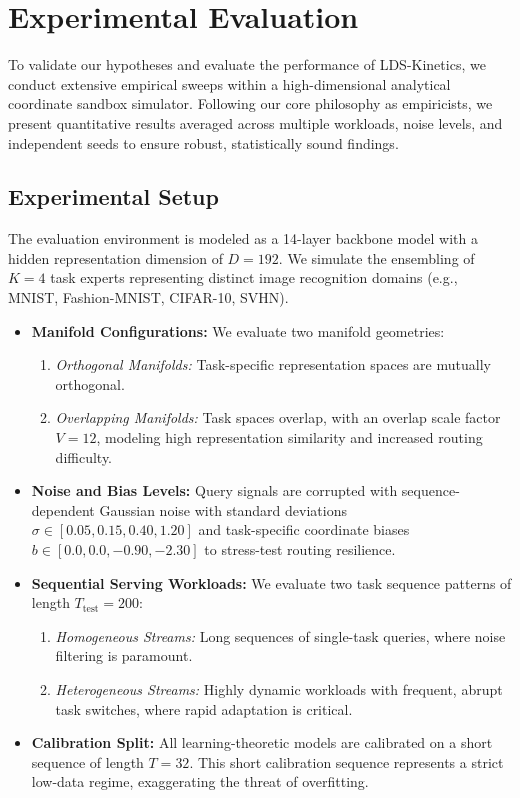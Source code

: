 \section{Experimental Evaluation}
\label{submission:sec:experiments}

To validate our hypotheses and evaluate the performance of LDS-Kinetics, we conduct extensive empirical sweeps within a high-dimensional analytical coordinate sandbox simulator. Following our core philosophy as empiricists, we present quantitative results averaged across multiple workloads, noise levels, and independent seeds to ensure robust, statistically sound findings.

\subsection{Experimental Setup}
The evaluation environment is modeled as a 14-layer backbone model with a hidden representation dimension of $D = 192$. We simulate the ensembling of $K = 4$ task experts representing distinct image recognition domains (e.g., MNIST, Fashion-MNIST, CIFAR-10, SVHN).

\begin{itemize}
    \item \textbf{Manifold Configurations:} We evaluate two manifold geometries:
    \begin{enumerate}
        \item \emph{Orthogonal Manifolds:} Task-specific representation spaces are mutually orthogonal.
        \item \emph{Overlapping Manifolds:} Task spaces overlap, with an overlap scale factor $V = 12$, modeling high representation similarity and increased routing difficulty.
    \end{enumerate}
    \item \textbf{Noise and Bias Levels:} Query signals are corrupted with sequence-dependent Gaussian noise with standard deviations $\sigma \in [0.05, 0.15, 0.40, 1.20]$ and task-specific coordinate biases $b \in [0.0, 0.0, -0.90, -2.30]$ to stress-test routing resilience.
    \item \textbf{Sequential Serving Workloads:} We evaluate two task sequence patterns of length $T_{\text{test}} = 200$:
    \begin{enumerate}
        \item \emph{Homogeneous Streams:} Long sequences of single-task queries, where noise filtering is paramount.
        \item \emph{Heterogeneous Streams:} Highly dynamic workloads with frequent, abrupt task switches, where rapid adaptation is critical.
    \end{enumerate}
    \item \textbf{Calibration Split:} All learning-theoretic models are calibrated on a short sequence of length $T = 32$. This short calibration sequence represents a strict low-data regime, exaggerating the threat of overfitting.
\end{itemize}

